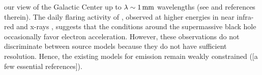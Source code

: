 our view of the Galactic Center up to $\lambda \sim 1\,\mathrm{mm}$ wavelengths %
(see \citealt{2018ApJ...865..104J} and references therein). The daily flaring activity of \sgra, observed at higher energies in near infra-red and x-rays \citep[e.g.,][]{2009ApJ...698..676D, 2019ApJ...886...96H}, suggests that the conditions around the supermassive black hole occasionally favor electron acceleration. %
However, these observations do not discriminate between source models because they do not have sufficient resolution. Hence, the existing models for \sgra emission remain weakly constrained ([a few essential references]). 

